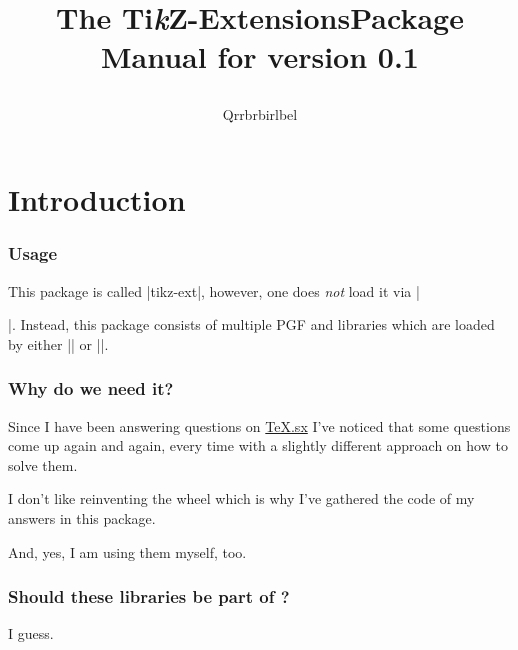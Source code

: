 %
%
%
\newcommand*\tikzextname{Ti\emph{k}Z-Extensions}
\newcommand*\tikzextversion{0.1}


\title{\bfseries The \tikzextname\space Package\\
  \large Manual for version \tikzextversion\\[1mm]
\author{Qrrbrbirlbel}}

\maketitle
\label{table-of-contents}

\tableofcontents

\clearpage
\part{Introduction}
\begin{multicols}{2}
\section{Usage}
This package is called |tikz-ext|, however, one does \emph{not} load it via |\usepackage{tikz-ext}|.
Instead, this package consists of multiple PGF and \tikzname\space libraries
which are loaded by either |\usepgflibrary| or |\usetikzlibrary|.

\section{Why do we need it?}
Since I have been answering questions on \hyperlink{https://tex.stackexchange.com}{TeX.sx}
I've noticed that some questions come up again and again,
every time with a slightly different approach on how to solve them.

I don't like reinventing the wheel which is why I've gathered the code of my answers in this package.

And, yes, I am using them myself, too.

\section{Should these libraries be part of \tikzname?}
I guess.
\end{multicols}

